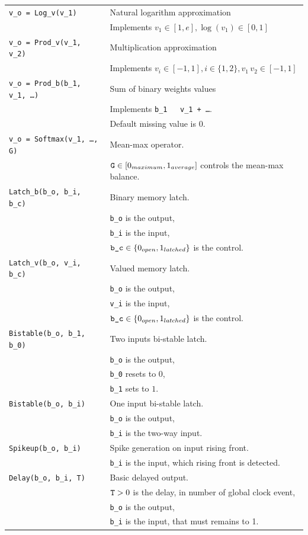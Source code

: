 \documentclass[a4]{article} \usepackage[left=2cm,right=3cm,top=1cm,bottom=2cm]{geometry}
\begin{document}
{\begin{tabular}{ll}
  {\tt v\_o = Log\_v(v\_1)} & Natural logarithm approximation \\& Implements $v_1 \in [1, e], \log(v_1) \in [0, 1]$ \\
  {\tt v\_o = Prod\_v(v\_1, v\_2)} & Multiplication approximation \\& Implements $v_i \in [-1, 1], i \in \{1, 2\}, v_1 \, v_2 \in  [-1, 1]$ \\
  {\tt v\_o = Prod\_b(b\_1, v\_1, …)} & Sum of binary weights values\\& Implements {\tt b\_1 \, v\_1 + …}.\\& Default missing value is $0$.\\
  {\tt v\_o = Softmax(v\_1, …, G)} & Mean-max operator. \\ & $\mbox{{\tt G}} \in [0_{maximum}, 1_{average}]$ controls the mean-max balance.\\
  {\tt Latch\_b(b\_o, b\_i, b\_c)} & Binary memory latch. \\& {\tt b\_o} is the  output, \\& {\tt b\_i} is the input,  \\& $\mbox{{\tt b\_c}} \in \{0_{open}, 1_{latched}\}$ is the control. \\
  {\tt Latch\_v(b\_o, v\_i, b\_c)} & Valued memory latch. \\& {\tt b\_o} is the  output, \\& {\tt v\_i} is the input,  \\& $\mbox{{\tt b\_c}} \in \{0_{open}, 1_{latched}\}$ is the control. \\
  {\tt Bistable(b\_o, b\_1, b\_0)} & Two inputs bi-stable latch. \\& {\tt b\_o} is the  output, \\& {\tt b\_0} resets to $0$, \\& {\tt b\_1} sets to $1$. \\
  {\tt Bistable(b\_o, b\_i)} & One input bi-stable latch. \\& {\tt b\_o} is the  output, \\& {\tt b\_i} is the two-way input.\\
  {\tt Spikeup(b\_o, b\_i)} & Spike generation on input rising front. \\& {\tt b\_i} is the input, which rising front is detected.\\
  {\tt Delay(b\_o, b\_i, T)} & Basic delayed output. \\& $\mbox{{\tt T}} > 0$ is the delay, in number of global clock event, \\& {\tt b\_o} is the  output, \\& {\tt b\_i} is the input, that must  remains to 1.\\

\end{tabular}}
\end{document}

